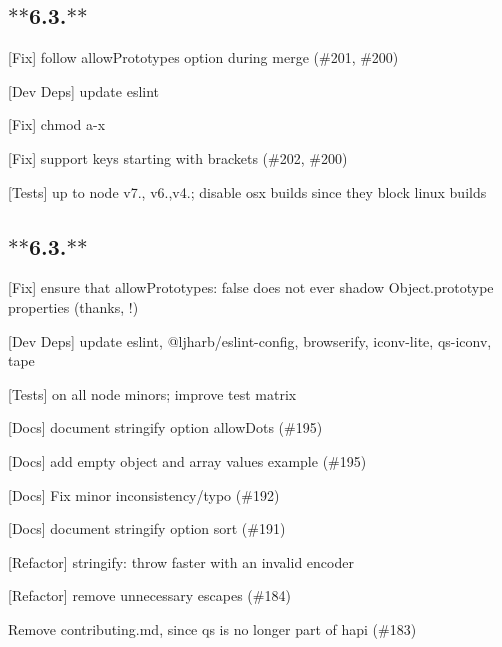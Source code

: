 \subsection*{$\ast$$\ast$6.3.$\ast$$\ast$}


\begin{DoxyItemize}
\item \mbox{[}Fix\mbox{]} follow {\ttfamily allow\+Prototypes} option during merge (\#201, \#200)
\item \mbox{[}Dev Deps\mbox{]} update {\ttfamily eslint}
\item \mbox{[}Fix\mbox{]} chmod a-\/x
\item \mbox{[}Fix\mbox{]} support keys starting with brackets (\#202, \#200)
\item \mbox{[}Tests\mbox{]} up to {\ttfamily node} {\ttfamily v7.}, {\ttfamily v6.},{\ttfamily v4.}; disable osx builds since they block linux builds
\end{DoxyItemize}

\subsection*{$\ast$$\ast$6.3.$\ast$$\ast$}


\begin{DoxyItemize}
\item \mbox{[}Fix\mbox{]} ensure that {\ttfamily allow\+Prototypes\+: false} does not ever shadow Object.\+prototype properties (thanks, !)
\item \mbox{[}Dev Deps\mbox{]} update {\ttfamily eslint}, {\ttfamily @ljharb/eslint-\/config}, {\ttfamily browserify}, {\ttfamily iconv-\/lite}, {\ttfamily qs-\/iconv}, {\ttfamily tape}
\item \mbox{[}Tests\mbox{]} on all node minors; improve test matrix
\item \mbox{[}Docs\mbox{]} document stringify option {\ttfamily allow\+Dots} (\#195)
\item \mbox{[}Docs\mbox{]} add empty object and array values example (\#195)
\item \mbox{[}Docs\mbox{]} Fix minor inconsistency/typo (\#192)
\item \mbox{[}Docs\mbox{]} document stringify option {\ttfamily sort} (\#191)
\item \mbox{[}Refactor\mbox{]} {\ttfamily stringify}\+: throw faster with an invalid encoder
\item \mbox{[}Refactor\mbox{]} remove unnecessary escapes (\#184)
\item Remove contributing.\+md, since {\ttfamily qs} is no longer part of {\ttfamily hapi} (\#183)
\end{DoxyItemize}

